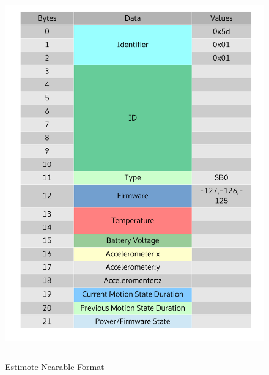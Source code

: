 \begin{figure}[htbp]
  \centering
    \includegraphics[scale=0.4]{Figures/data_format.pdf}
    \rule{35em}{0.5pt}
  \caption[Estimote Nearable Format]{Estimote Nearable Format}
  \label{fig:estimote_format}
\end{figure}
